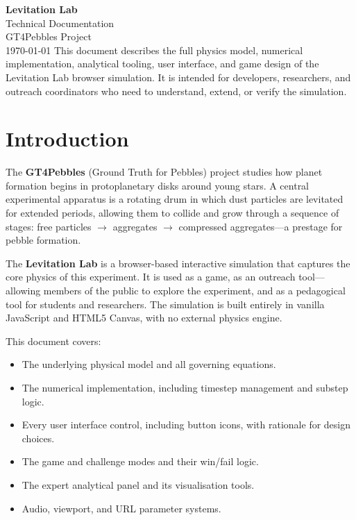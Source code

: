 \documentclass[12pt, a4paper]{article}
\begin{document}

\begin{titlepage}
  \centering
  \vspace*{3cm}
  {\Huge\bfseries Levitation Lab\\[0.4em]}
  {\Large Technical Documentation\\[2em]}
  {\large GT4Pebbles Project\\[0.5em]}
  {\large \today}
  \vfill
  {\small
    This document describes the full physics model, numerical implementation,
    analytical tooling, user interface, and game design of the Levitation Lab
    browser simulation. It is intended for developers, researchers, and outreach
    coordinators who need to understand, extend, or verify the simulation.
  }
\end{titlepage}

\tableofcontents
\clearpage
{}
\setcounter{page}{1}


\section{Introduction}

The \textbf{GT4Pebbles} (Ground Truth for Pebbles) project studies how planet
formation begins in protoplanetary disks around young stars. A central
experimental apparatus is a rotating drum in which dust particles are
levitated for extended periods, allowing them to collide and grow through a
sequence of stages: free particles $\to$ aggregates $\to$ compressed
aggregates---a prestage for pebble formation.

The \textbf{Levitation Lab} is a browser-based interactive simulation
that captures the core physics of this experiment. It is used as a
game, as an outreach tool---allowing members of the public to
explore the experiment, and as a pedagogical tool for students and
researchers. The simulation is built entirely in vanilla JavaScript
and HTML5 Canvas, with no external physics engine.

This document covers:
\begin{itemize}
  \item The underlying physical model and all governing equations.
  \item The numerical implementation, including timestep management and
        substep logic.
  \item Every user interface control, including button icons, with rationale
        for design choices.
  \item The game and challenge modes and their win/fail logic.
  \item The expert analytical panel and its visualisation tools.
  \item Audio, viewport, and URL parameter systems.
\end{itemize}
\end{document}
